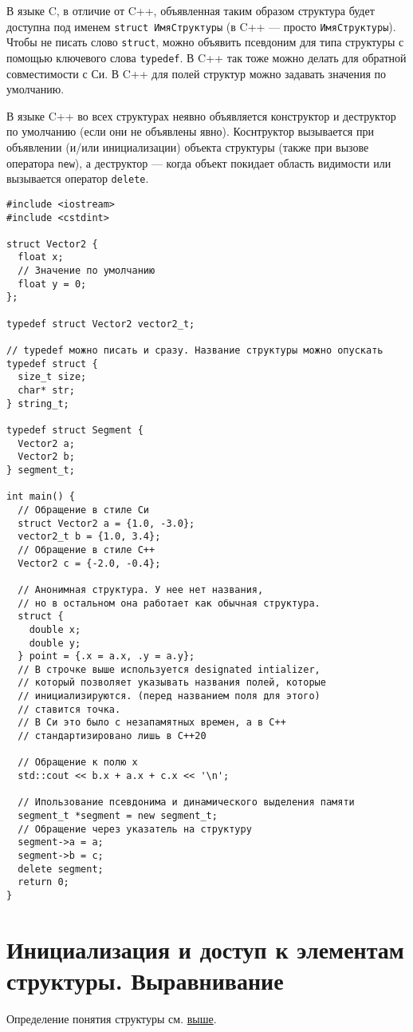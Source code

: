 В языке C, в отличие от C++, объявленная таким образом структура будет доступна под именем
\verb|struct ИмяСтруктуры| (в C++ --- просто \verb|ИмяСтруктуры|). Чтобы не писать слово
\verb|struct|, можно объявить псевдоним для типа структуры с помощью ключевого слова
\verb|typedef|. В C++ так тоже можно делать для обратной совместимости с Си. В C++
для полей структур можно задавать значения по умолчанию.

{\small В языке C++ во всех структурах неявно объявляется конструктор и деструктор по умолчанию
(если они не объявлены явно). Коснтруктор вызывается при объявлении (и/или инициализации) объекта
структуры (также при вызове оператора \verb|new|), а деструктор --- когда объект покидает
область видимости или вызывается оператор \verb|delete|.}
\begin{verbatim}
#include <iostream>
#include <cstdint>

struct Vector2 {
  float x;
  // Значение по умолчанию
  float y = 0;
};

typedef struct Vector2 vector2_t;

// typedef можно писать и сразу. Название структуры можно опускать
typedef struct {
  size_t size;
  char* str;
} string_t;

typedef struct Segment {
  Vector2 a;
  Vector2 b;
} segment_t;

int main() {
  // Обращение в стиле Си
  struct Vector2 a = {1.0, -3.0};
  vector2_t b = {1.0, 3.4};
  // Обращение в стиле C++
  Vector2 c = {-2.0, -0.4};

  // Анонимная структура. У нее нет названия,
  // но в остальном она работает как обычная структура.
  struct {
    double x;
    double y;
  } point = {.x = a.x, .y = a.y};
  // В строчке выше используется designated intializer,
  // который позволяет указывать названия полей, которые
  // инициализируются. (перед названием поля для этого)
  // ставится точка.
  // В Си это было с незапамятных времен, а в C++
  // стандартизировано лишь в C++20

  // Обращение к полю x
  std::cout << b.x + a.x + c.x << '\n';
  
  // Ипользование псевдонима и динамического выделения памяти
  segment_t *segment = new segment_t;
  // Обращение через указатель на структуру
  segment->a = a;
  segment->b = c;
  delete segment;
  return 0;
}
\end{verbatim}

\section{Инициализация и доступ к элементам структуры. Выравнивание}
Определение понятия структуры см. \hyperref[def:struct]{выше}.

